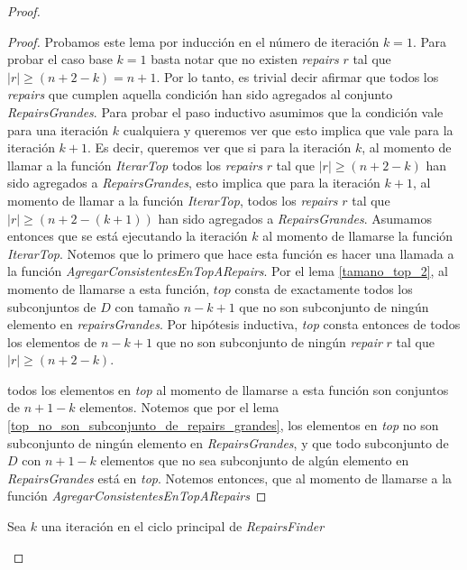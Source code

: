 \documentclass[11pt,a4paper,twoside]{tesis}
\begin{document}
\begin{proof}
\begin{proof}
Probamos este lema por inducción en el número de iteración $k=1$. Para probar el caso base $k=1$ basta notar que no existen \textit{repairs} $r$ tal que $|r| \geq (n + 2 - k) = n+1$. Por lo tanto, es trivial decir afirmar que todos los \textit{repairs} que cumplen aquella condición han sido agregados al conjunto \textit{RepairsGrandes}.
Para probar el paso inductivo asumimos que la condición vale para una iteración $k$ cualquiera y queremos ver que esto implica que vale para la iteración $k+1$. Es decir, queremos ver que si para la iteración $k$, al momento de llamar a la función \textit{IterarTop} todos los \textit{repairs} $r$ tal que  $|r| \geq (n + 2 - k)$ han sido agregados a \textit{RepairsGrandes}, esto implica que para la iteración $k+1$, al momento de llamar a la función \textit{IterarTop}, todos los \textit{repairs} $r$ tal que  $|r| \geq (n + 2 - (k+1))$ han sido agregados a \textit{RepairsGrandes}. 
Asumamos entonces que se está ejecutando la iteración $k$ al momento de llamarse la función \textit{IterarTop}. Notemos que lo primero que hace esta función es hacer una llamada a la función \textit{AgregarConsistentesEnTopARepairs}. Por el lema \ref{tamano_top_2}, al momento de llamarse a esta función, $top$ consta de exactamente todos los subconjuntos de $D$ con tamaño $n - k + 1$ que no son subconjunto de ningún elemento en \textit{repairsGrandes}. Por hipótesis inductiva, \textit{top} consta entonces de todos los elementos de $n - k + 1$ que no son subconjunto de ningún \textit{repair} $r$ tal que $|r| \geq (n + 2 - k)$. 


todos los elementos en \textit{top} al momento de llamarse a esta función son conjuntos de  $n + 1 - k$ elementos. Notemos que por el lema \ref{top_no_son_subconjunto_de_repairs_grandes}, los elementos en \textit{top} no son subconjunto de ningún elemento en \textit{RepairsGrandes}, y que todo subconjunto de $D$ con $n + 1 - k$ elementos que no sea subconjunto de algún elemento en \textit{RepairsGrandes} está en \textit{top}.  
Notemos entonces, que al momento de llamarse a la función \textit{AgregarConsistentesEnTopARepairs}

\end{proof}

\begin{lemma}\label{todos_los_no_sub_de_repairs_de_n-k+1_estan_en_top}
Sea $k$ una iteración en el ciclo principal de \textit{RepairsFinder}

\end{lemma}



\end{proof}
\end{document}

